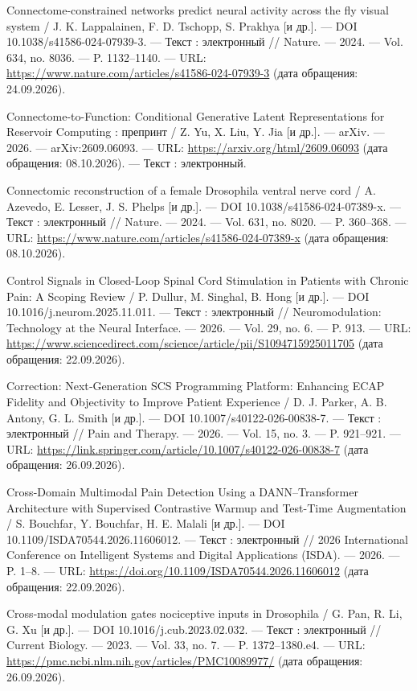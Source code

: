 \begin{list}{}{\setlength{\leftmargin}{10mm}\setlength{\labelwidth}{8mm}\setlength{\labelsep}{2mm}\setlength{\itemsep}{0pt}\setlength{\parsep}{0pt}\setlength{\topsep}{0pt}}
\item[70.] Connectome-constrained networks predict neural activity across the fly visual system / J. K. Lappalainen, F. D. Tschopp, S. Prakhya [и др.]. — DOI 10.1038/s41586-024-07939-3. — Текст : электронный // Nature. — 2024. — Vol. 634, no. 8036. — P. 1132–1140. — URL: \url{https://www.nature.com/articles/s41586-024-07939-3} (дата обращения: 24.09.2026).
\item[71.] Connectome-to-Function: Conditional Generative Latent Representations for Reservoir Computing : препринт / Z. Yu, X. Liu, Y. Jia [и др.]. — arXiv. — 2026. — arXiv:2609.06093. — URL: \url{https://arxiv.org/html/2609.06093} (дата обращения: 08.10.2026). — Текст : электронный.
\item[72.] Connectomic reconstruction of a female Drosophila ventral nerve cord / A. Azevedo, E. Lesser, J. S. Phelps [и др.]. — DOI 10.1038/s41586-024-07389-x. — Текст : электронный // Nature. — 2024. — Vol. 631, no. 8020. — P. 360–368. — URL: \url{https://www.nature.com/articles/s41586-024-07389-x} (дата обращения: 08.10.2026).
\item[73.] Control Signals in Closed-Loop Spinal Cord Stimulation in Patients with Chronic Pain: A Scoping Review / P. Dullur, M. Singhal, B. Hong [и др.]. — DOI 10.1016/j.neurom.2025.11.011. — Текст : электронный // Neuromodulation: Technology at the Neural Interface. — 2026. — Vol. 29, no. 6. — P. 913. — URL: \url{https://www.sciencedirect.com/science/article/pii/S1094715925011705} (дата обращения: 22.09.2026).
\item[74.] Correction: Next‑Generation SCS Programming Platform: Enhancing ECAP Fidelity and Objectivity to Improve Patient Experience / D. J. Parker, A. B. Antony, G. L. Smith [и др.]. — DOI 10.1007/s40122-026-00838-7. — Текст : электронный // Pain and Therapy. — 2026. — Vol. 15, no. 3. — P. 921–921. — URL: \url{https://link.springer.com/article/10.1007/s40122-026-00838-7} (дата обращения: 26.09.2026).
\item[75.] Cross-Domain Multimodal Pain Detection Using a DANN–Transformer Architecture with Supervised Contrastive Warmup and Test-Time Augmentation / S. Bouchfar, Y. Bouchfar, H. E. Malali [и др.]. — DOI 10.1109/ISDA70544.2026.11606012. — Текст : электронный // 2026 International Conference on Intelligent Systems and Digital Applications (ISDA). — 2026. — P. 1–8. — URL: \url{https://doi.org/10.1109/ISDA70544.2026.11606012} (дата обращения: 22.09.2026).
\item[76.] Cross-modal modulation gates nociceptive inputs in Drosophila / G. Pan, R. Li, G. Xu [и др.]. — DOI 10.1016/j.cub.2023.02.032. — Текст : электронный // Current Biology. — 2023. — Vol. 33, no. 7. — P. 1372–1380.e4. — URL: \url{https://pmc.ncbi.nlm.nih.gov/articles/PMC10089977/} (дата обращения: 26.09.2026).

\end{list}

